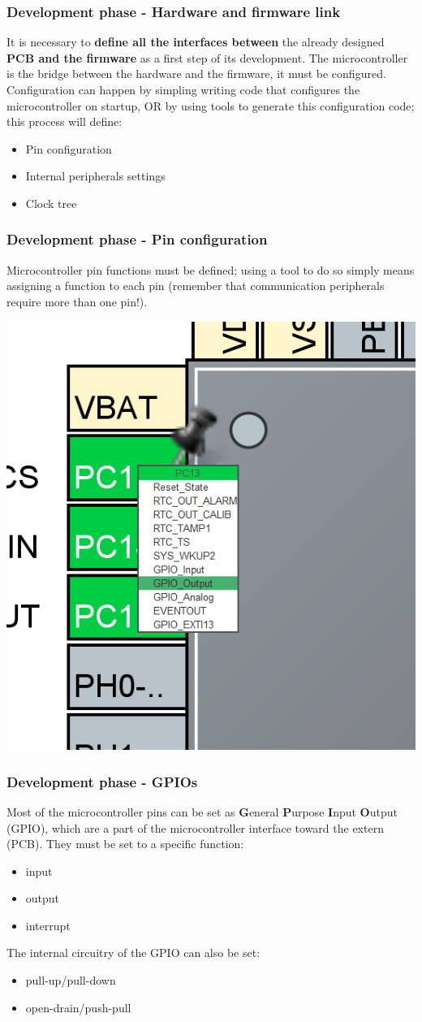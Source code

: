 \documentclass[11pt,xcolor=table,aspectratio=169]{beamer}
\begin{document}
	\begin{frame}
		\frametitle{Development phase - Hardware and firmware link}
		It is necessary to \textbf{define all the interfaces between} the already designed \textbf{PCB and the firmware} as a first step of its development. The microcontroller is the bridge between the hardware and the firmware, it must be configured.\\
		Configuration can happen by simpling writing code that configures the microcontroller on startup, OR by using tools to generate this configuration code; this process will define:
		\begin{itemize}
			\item Pin configuration
			\item Internal peripherals settings
			\item Clock tree
		\end{itemize}
	\end{frame}

	\begin{frame}
		\frametitle{Development phase - Pin configuration}
		Microcontroller pin functions must be defined; using a tool to do so simply means assigning a function to each pin (remember that communication peripherals require more than one pin!).\\
		\begin{center}
			\includegraphics[width=.3\textwidth]{media/pin_config.png}
		\end{center}
	\end{frame}

	\begin{frame}
		\frametitle{Development phase - GPIOs}
		Most of the microcontroller pins can be set as \textbf{G}eneral \textbf{P}urpose \textbf{I}nput \textbf{O}utput (GPIO), which are a part of the microcontroller interface toward the extern (PCB). They must be set to a specific function:
		\begin{itemize}
			\item input
			\item output
			\item interrupt
		\end{itemize}
		The internal circuitry of the GPIO can also be set:
		\begin{itemize}
			\item pull-up/pull-down
			\item open-drain/push-pull
		\end{itemize}
	\end{frame}
\end{document}

